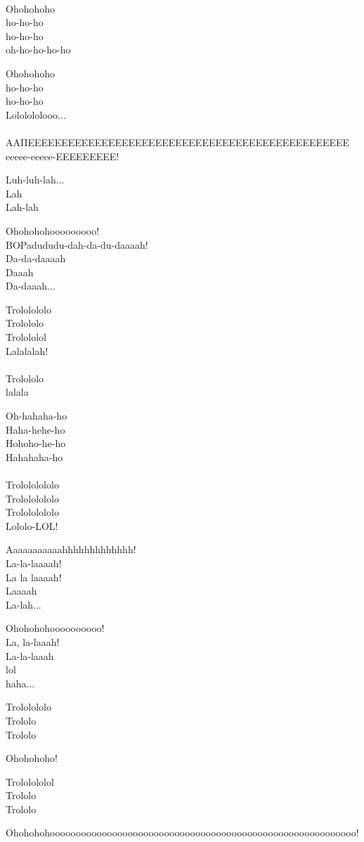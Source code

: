 \\
Ohohohoho\\
ho-ho-ho\\
ho-ho-ho\\
oh-ho-ho-ho-ho\par
\vspace{10pt}
Ohohohoho\\
ho-ho-ho\\
ho-ho-ho\\
Lololololooo...\\
\\
AAIIEEEEEEEEEEEEEEEEEEEEEEEEEEEEEEEEEEEEEEEEEEEEEEEE\\
eeeee-eeeee-EEEEEEEEE!\par
\vspace{10pt}
Luh-luh-lah...\\
Lah\\
Lah-lah\par
\vspace{10pt}
Ohohohohooooooooo!\\
BOPadududu-dah-da-du-daaaah!\\
Da-da-daaaah\\
Daaah\\
Da-daaah...\par
\vspace{10pt}
Trololololo\\
Trolololo\\
Trolololol\\
Lalalalah!\\
\\
Trolololo\\
lalala\par
\vspace{10pt}
Oh-hahaha-ho\\
Haha-hehe-ho\\
Hohoho-he-ho\\
Hahahaha-ho\\
\\
Trolololololo\\
Trolololololo\\
Trolololololo\\
Lololo-LOL!\par
\vspace{10pt}
Aaaaaaaaaaahhhhhhhhhhhhh!\\
La-la-laaaah!\\
La la laaaah!\\
Laaaah\\
La-lah...\par
\vspace{10pt}
Ohohohohoooooooooo!\\
La, la-laaah!\\
La-la-laaah\\
lol\\
haha...\par
\vspace{10pt}
Trololololo\\
Trololo\\
Trololo\par
\vspace{10pt}
Ohohohoho!\par
\vspace{10pt}
Trololololol\\
Trololo\\
Trololo\par
\vspace{10pt}
Ohohohohooooooooooooooooooooooooooooooooooooooooooooooooooooooooooo!
